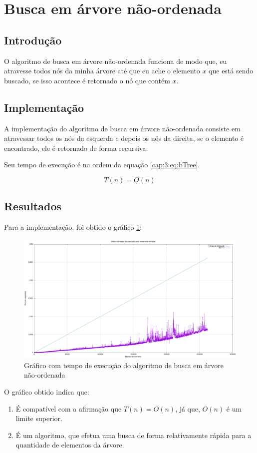 \section{Busca em árvore não-ordenada} \label{cap:3:section:btree}

\subsection{Introdução}

O algoritmo de busca em árvore não-ordenada funciona de modo que, eu atravesse todos
nós da minha árvore até que eu ache o elemento $x$ que está sendo buscado, se isso acontece
é retornado o nó que contém $x$.

\subsection{Implementação}

A implementação do algoritmo de busca em árvore não-ordenada consiste em atravessar todos os
nós da esquerda e depois os nós da direita, se o elemento é encontrado, ele é retornado de forma
recursiva.



Seu tempo de execução é na ordem da equação \ref{cap:3:eq:bTree}.

\begin{equation} \label{cap:3:eq:bTree}
    T(n) = O(n)
\end{equation}

\subsection{Resultados}

Para a implementação, foi obtido o gráfico \ref{cap:3:graph:bTree}:

\begin{figure}[h]
    \centering
    \includegraphics[width=\textwidth]{image/graphics/btree.png}
    \caption{Gráfico com tempo de execução do algoritmo de busca em árvore não-ordenada}
    \label{cap:3:graph:bTree}
\end{figure}

O gráfico obtido indica que:

\begin{enumerate}
    \item É compatível com a afirmação que $T(n) = O(n)$, já que, $O(n)$ é um limite superior.
    \item É um algoritmo, que efetua uma busca de forma relativamente rápida para a quantidade de elementos
    da árvore.
\end{enumerate}
